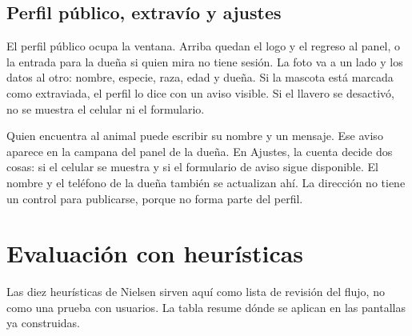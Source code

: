 \documentclass[12pt,a4paper]{article}
\begin{document}
\subsection{Perfil público, extravío y ajustes}

El perfil público ocupa la ventana. Arriba quedan el logo y el regreso al panel, o la entrada para la dueña si quien mira no tiene sesión. La foto va a un lado y los datos al otro: nombre, especie, raza, edad y dueña. Si la mascota está marcada como extraviada, el perfil lo dice con un aviso visible. Si el llavero se desactivó, no se muestra el celular ni el formulario.

Quien encuentra al animal puede escribir su nombre y un mensaje. Ese aviso aparece en la campana del panel de la dueña. En Ajustes, la cuenta decide dos cosas: si el celular se muestra y si el formulario de aviso sigue disponible. El nombre y el teléfono de la dueña también se actualizan ahí. La dirección no tiene un control para publicarse, porque no forma parte del perfil.

\section{Evaluación con heurísticas}

Las diez heurísticas de Nielsen sirven aquí como lista de revisión del flujo, no como una prueba con usuarios. La tabla resume dónde se aplican en las pantallas ya construidas.
\end{document}
